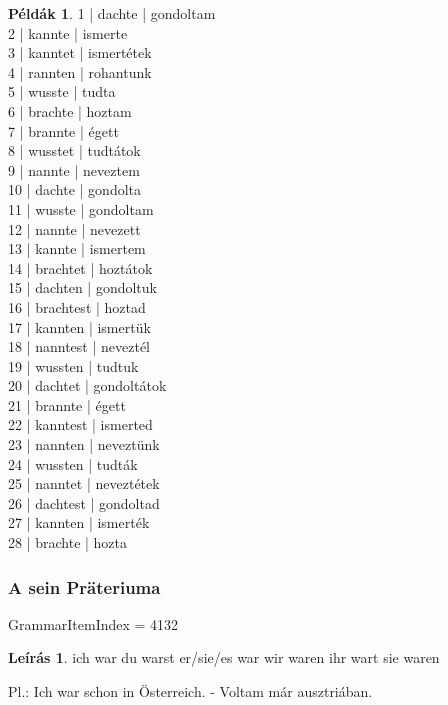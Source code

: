 \documentclass{article}
\theoremstyle{definition}
\newtheorem*{exmp}{Példák}
\newtheorem*{desc}{Leírás}
\begin{document}
\begin{exmp}
1 | dachte | gondoltam\\
2 | kannte | ismerte\\
3 | kanntet | ismertétek\\
4 | rannten | rohantunk\\
5 | wusste | tudta\\
6 | brachte | hoztam\\
7 | brannte | égett\\
8 | wusstet | tudtátok\\
9 | nannte | neveztem\\
10 | dachte | gondolta\\
11 | wusste | gondoltam\\
12 | nannte | nevezett\\
13 | kannte | ismertem\\
14 | brachtet | hoztátok\\
15 | dachten | gondoltuk\\
16 | brachtest | hoztad\\
17 | kannten | ismertük\\
18 | nanntest | neveztél\\
19 | wussten | tudtuk\\
20 | dachtet | gondoltátok\\
21 | brannte | égett\\
22 | kanntest | ismerted\\
23 | nannten | neveztünk\\
24 | wussten | tudták\\
25 | nanntet | neveztétek\\
26 | dachtest | gondoltad\\
27 | kannten | ismerték\\
28 | brachte | hozta\\
\end{exmp}

\subsubsection{A sein Präteriuma}

GrammarItemIndex = 4132

\begin{desc}
ich war
du warst
er/sie/es war
wir waren
ihr wart
sie waren

Pl.: Ich war schon in Österreich. - Voltam már ausztriában.
\end{desc}
\end{document}
